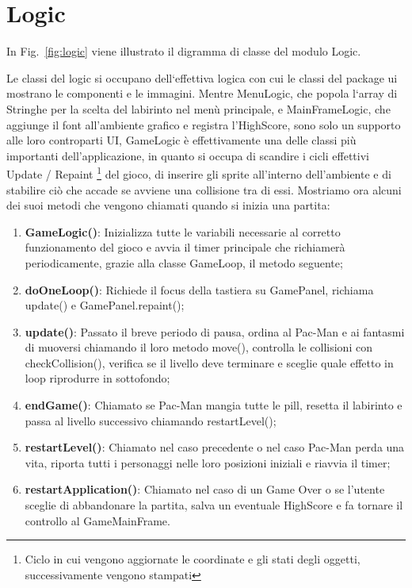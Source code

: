 \documentclass[12pt,a4paper]{report}
\begin{document}

\section{Logic}\label{se:arch.logic}
In Fig.~\ref{fig:logic} viene illustrato il digramma di classe del modulo Logic.\newline

Le classi del logic si occupano dell`effettiva logica con cui le classi del package ui mostrano le componenti e le immagini. Mentre MenuLogic, che popola l`array di Stringhe per la scelta del labirinto nel menù principale, e MainFrameLogic, che aggiunge il font all’ambiente grafico e registra l’HighScore, sono solo un supporto alle loro controparti UI, GameLogic è effettivamente una delle classi più importanti dell’applicazione, in quanto si occupa di scandire i cicli effettivi Update / Repaint \footnote{ Ciclo in cui vengono aggiornate le coordinate e gli stati degli oggetti, successivamente vengono stampati} del gioco, di inserire gli sprite all’interno dell’ambiente e di stabilire ciò che accade se avviene una collisione tra di essi. Mostriamo ora alcuni dei suoi metodi che vengono chiamati quando si inizia una partita:
\begin{enumerate}
 \item \textbf{GameLogic()}: Inizializza tutte le variabili necessarie al corretto funzionamento del gioco e avvia il timer principale che richiamerà periodicamente, grazie alla classe GameLoop, il metodo seguente;
 \item \textbf{doOneLoop()}: Richiede il focus della tastiera su GamePanel, richiama update() e GamePanel.repaint();
 \item \textbf{update()}: Passato il breve periodo di pausa, ordina al Pac-Man e ai fantasmi di muoversi chiamando il loro metodo move(), controlla le collisioni con checkCollision(), verifica se il livello deve terminare e sceglie quale effetto in loop riprodurre in sottofondo;
 \item \textbf{endGame()}: Chiamato se Pac-Man mangia tutte le pill, resetta il labirinto e passa al livello successivo chiamando restartLevel();
 \item \textbf{restartLevel()}: Chiamato nel caso precedente o nel caso Pac-Man perda una vita, riporta tutti i personaggi nelle loro posizioni iniziali e riavvia il timer;
 \item \textbf{restartApplication()}: Chiamato nel caso di un Game Over o se l’utente sceglie di abbandonare la partita, salva un eventuale HighScore e fa tornare il controllo al GameMainFrame.
\end{enumerate}
\end{document}
